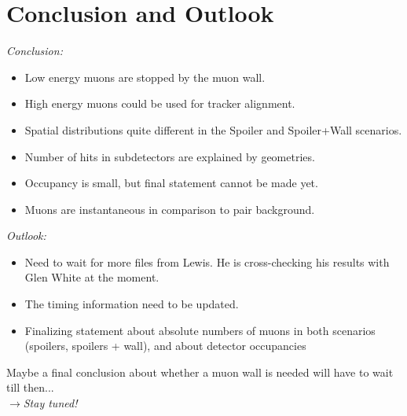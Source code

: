 \documentclass[xcolor={dvipsnames}]{beamer}
\begin{document}
\section{Conclusion and Outlook}
\begin{frame}
\textit{Conclusion:}
\begin{itemize}
\item Low energy muons are stopped by the muon wall.
\item High energy muons could be used for tracker alignment.
\item Spatial distributions quite different in the Spoiler and Spoiler+Wall scenarios.
\item Number of hits in subdetectors are explained by geometries.
\item Occupancy is small, but final statement cannot be made yet.
\item Muons are instantaneous in comparison to pair background.
\end{itemize}
\textit{Outlook:}
\begin{itemize}
\item Need to wait for more files from Lewis. He is cross-checking his results with Glen White at the moment.
\item The timing information need to be updated.
\item Finalizing statement about absolute numbers of muons in both scenarios (spoilers, spoilers + wall), and about detector occupancies
\end{itemize}
\alert{Maybe a final conclusion about whether a muon wall is needed will have to wait till then...\\
$\rightarrow$\textit{Stay tuned!}}
\end{frame}
\end{document}
